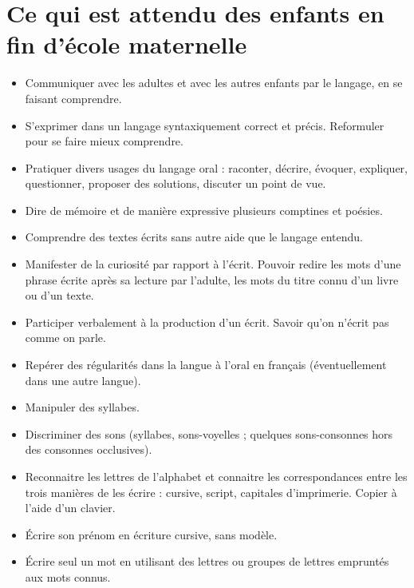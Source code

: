 \section{Ce qui est attendu des enfants en fin d’école maternelle}
\begin{itemize}
\item Communiquer avec les adultes et avec les autres enfants par le langage, en se faisant comprendre.
\item S’exprimer dans un langage syntaxiquement correct et précis. Reformuler pour se faire mieux comprendre.
\item Pratiquer divers usages du langage oral : raconter, décrire, évoquer, expliquer, questionner, proposer des solutions, discuter un point de vue.
\item Dire de mémoire et de manière expressive plusieurs comptines et poésies.
\item Comprendre des textes écrits sans autre aide que le langage entendu.
\item Manifester de la curiosité par rapport à l’écrit. Pouvoir redire les mots d’une phrase écrite après sa lecture par l’adulte, les mots du titre connu d’un livre ou d’un texte.
\item Participer verbalement à la production d’un écrit. Savoir qu’on n’écrit pas comme on parle.
\item Repérer des régularités dans la langue à l’oral en français (éventuellement dans une autre langue). 
\item Manipuler des syllabes.
\item Discriminer des sons (syllabes, sons-voyelles ; quelques sons-consonnes hors des consonnes occlusives).
\item Reconnaitre les lettres de l’alphabet et connaitre les correspondances entre les trois manières de les écrire : cursive, script, capitales d’imprimerie. Copier à l’aide d’un clavier.
\item Écrire son prénom en écriture cursive, sans modèle.
\item Écrire seul un mot en utilisant des lettres ou groupes de lettres empruntés aux mots connus.
\end{itemize}

